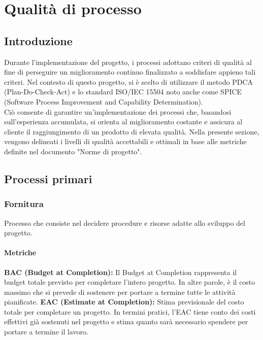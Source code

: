 \section{Qualità di processo}
\subsection{Introduzione}
Durante l'implementazione del progetto, i processi adottano criteri di qualità al fine di perseguire un miglioramento continuo finalizzato a soddisfare appieno tali criteri.
 Nel contesto di questo progetto, si è scelto di utilizzare il metodo PDCA (Plan-Do-Check-Act) e lo standard ISO/IEC 15504 noto anche come SPICE (Software Process Improvement and Capability Determination).
\\
Ciò consente di garantire un'implementazione dei processi che, basandosi sull'esperienza accumulata, si orienta al miglioramento costante e assicura al cliente il raggiungimento di un prodotto di elevata qualità. Nella presente sezione, vengono delineati i livelli di qualità accettabili e ottimali in base alle metriche definite nel documento "Norme di progetto".

\subsection{Processi primari}
\subsubsection{Fornitura}
Processo che consiste nel decidere procedure e risorse
adatte allo sviluppo del progetto.

\paragraph{Metriche}

\textbf{BAC (Budget at Completion):}
Il Budget at Completion rappresenta il budget totale previsto per completare l'intero progetto. In altre parole, è il costo massimo che si prevede di sostenere per portare a termine tutte le attività pianificate.
\vspace{0.1cm}
\textbf{EAC (Estimate at Completion):}
Stima previsionale del costo totale per completare un progetto. In termini pratici, l'EAC tiene conto dei costi effettivi già sostenuti nel progetto e stima quanto sarà necessario spendere per portare a termine il lavoro.
\setcounter{metriccounter}{1} %


